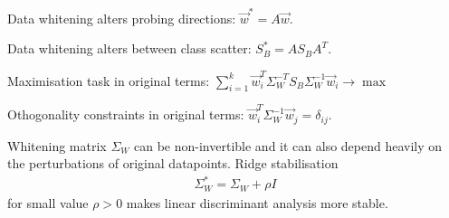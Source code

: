 \documentclass[landscape,footrule]{foils}
\begin{document}
\begin{triangles}
\item Data whitening alters probing directions: $\vec{w}^*=A\vec{w}$. 
\item Data whitening alters between class scatter: $S_B^*=AS_BA^T$. 
\item Maximisation task in original terms: $\sum_{i=1}^k\vec{w}_i^T\Sigma_W^{-T}S_B\Sigma_W^{-1}\vec{w}_i\to \max$
\item Othogonality constraints in original terms: $\vec{w}_i^T\Sigma_W^{-1}\vec{w}_j=\delta_{ij}$.\vspace*{-1cm}     
\end{triangles}


Whitening matrix $\Sigma_W$ can be non-invertible and it can also depend heavily on the perturbations of original datapoints. Ridge stabilisation 
\begin{align*}
\Sigma_W^*=\Sigma_W+\rho I
\end{align*}   
for small value $\rho>0$ makes linear discriminant analysis more stable.

\end{document}
